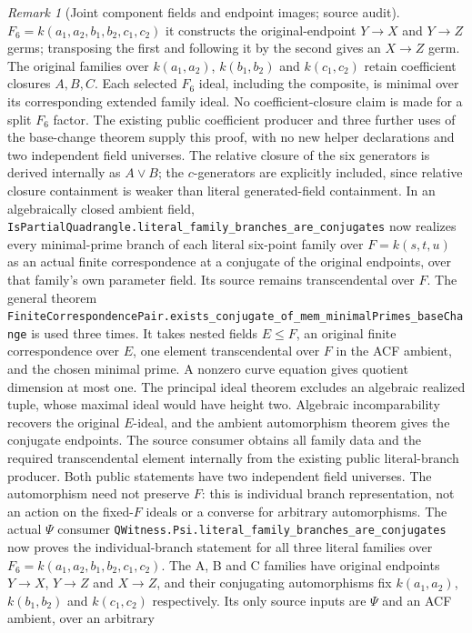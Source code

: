\documentclass[11pt,oneside]{article}
\theoremstyle{definition}
\theoremstyle{remark}
\newtheorem{remark}[theorem]{Remark}
\newcommand{\lean}[1]{\nolinkurl{#1}}
\begin{document}
\begin{remark}[Joint component fields and endpoint images; source audit]
$F_6=k(a_1,a_2,b_1,b_2,c_1,c_2)$ it constructs the original-endpoint
$Y\to X$ and $Y\to Z$ germs; transposing the first and following it by
the second gives an $X\to Z$ germ. The original families over
$k(a_1,a_2)$, $k(b_1,b_2)$ and $k(c_1,c_2)$ retain coefficient closures
$A,B,C$. Each selected $F_6$ ideal, including the composite, is minimal
over its corresponding extended family ideal. No coefficient-closure
claim is made for a split $F_6$ factor. The existing public coefficient
producer and three further uses of the base-change theorem supply this
proof, with no new helper declarations and two independent field universes.
The relative closure of the six generators is derived internally as
$A\vee B$; the $c$-generators are explicitly included, since relative
closure containment is weaker than literal generated-field containment.
In an algebraically closed ambient field,
\lean{IsPartialQuadrangle.literal_family_branches_are_conjugates} now realizes
every minimal-prime branch of each literal six-point family over $F=k(s,t,u)$
as an actual finite correspondence at a conjugate of the original endpoints,
over that family's own parameter field. Its source remains transcendental
over $F$. The general theorem
\lean{FiniteCorrespondencePair.exists_conjugate_of_mem_minimalPrimes_baseChange}
is used three times. It takes nested fields $E\leq F$, an original finite
correspondence over $E$, one element transcendental over $F$ in the ACF
ambient, and the chosen minimal prime. A nonzero curve equation gives quotient
dimension at most one. The principal ideal theorem excludes an algebraic
realized tuple, whose maximal ideal would have height two. Algebraic
incomparability recovers the original $E$-ideal, and the ambient automorphism
theorem gives the conjugate endpoints. The source consumer obtains all family
data and the required transcendental element internally from the existing
public literal-branch producer. Both public statements have two independent
field universes. The automorphism need not preserve $F$: this is individual
branch representation, not an action on the fixed-$F$ ideals or a converse
for arbitrary automorphisms.
The actual $\Psi$ consumer
\lean{QWitness.Psi.literal_family_branches_are_conjugates} now proves the
individual-branch statement for all three literal families over
$F_6=k(a_1,a_2,b_1,b_2,c_1,c_2)$. The A, B and C families have original
endpoints $Y\to X$, $Y\to Z$ and $X\to Z$, and their conjugating
automorphisms fix $k(a_1,a_2)$, $k(b_1,b_2)$ and $k(c_1,c_2)$ respectively.
Its only source inputs are $\Psi$ and an ACF ambient, over an arbitrary

\end{remark}
\end{document}
